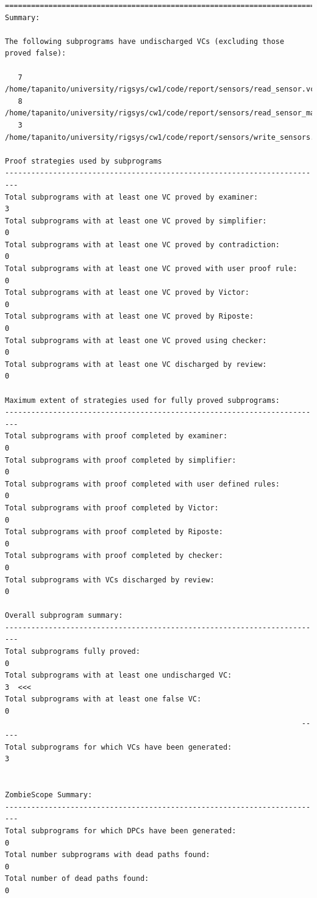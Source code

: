 \documentclass[a4paper, titlepage]{article}
\begin{document}
{\begin{lstlisting}
===============================================================================
Summary:

The following subprograms have undischarged VCs (excluding those proved false):

   7  /home/tapanito/university/rigsys/cw1/code/report/sensors/read_sensor.vcg
   8  /home/tapanito/university/rigsys/cw1/code/report/sensors/read_sensor_majority.vcg
   3  /home/tapanito/university/rigsys/cw1/code/report/sensors/write_sensors.vcg

Proof strategies used by subprograms
-------------------------------------------------------------------------
Total subprograms with at least one VC proved by examiner:              3
Total subprograms with at least one VC proved by simplifier:            0
Total subprograms with at least one VC proved by contradiction:         0
Total subprograms with at least one VC proved with user proof rule:     0
Total subprograms with at least one VC proved by Victor:                0
Total subprograms with at least one VC proved by Riposte:               0
Total subprograms with at least one VC proved using checker:            0
Total subprograms with at least one VC discharged by review:            0

Maximum extent of strategies used for fully proved subprograms:
-------------------------------------------------------------------------
Total subprograms with proof completed by examiner:                     0
Total subprograms with proof completed by simplifier:                   0
Total subprograms with proof completed with user defined rules:         0
Total subprograms with proof completed by Victor:                       0
Total subprograms with proof completed by Riposte:                      0
Total subprograms with proof completed by checker:                      0
Total subprograms with VCs discharged by review:                        0

Overall subprogram summary:
-------------------------------------------------------------------------
Total subprograms fully proved:                                         0
Total subprograms with at least one undischarged VC:                    3  <<<
Total subprograms with at least one false VC:                           0
                                                                    -----
Total subprograms for which VCs have been generated:                    3


ZombieScope Summary:
-------------------------------------------------------------------------
Total subprograms for which DPCs have been generated:                   0
Total number subprograms with dead paths found:                         0
Total number of dead paths found:                                       0



\end{lstlisting}}
\end{document}
